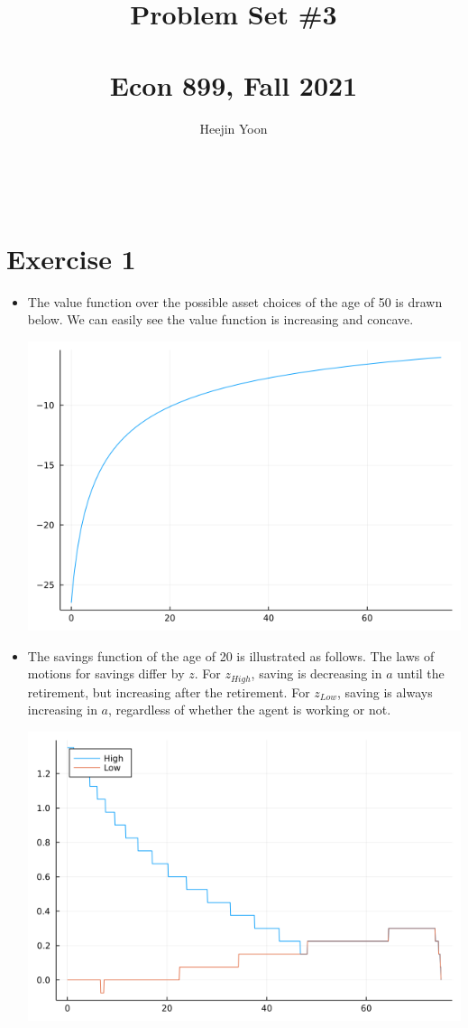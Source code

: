 \documentclass[11pt]{article} %
\title{Problem Set \#3\\ ~\\ \large{Econ 899, Fall 2021} }
\author{Heejin Yoon}
\begin{document}
\maketitle
~\\

\section*{Exercise 1}

\begin{itemize}
	\item The value function over the possible asset choices of the age of 50 is drawn below. We can easily see the value function is increasing and concave. 
	
	\begin{center}
		\includegraphics[width=.8\linewidth]{./julia/val_func_50.png}
	\end{center}
	\pagebreak
	\item The savings function of the age of 20 is illustrated as follows. The laws of motions for savings differ by $z$. For $z_{High}$, saving is decreasing in $a$ until the retirement, but increasing after the retirement. For $z_{Low}$, saving is always increasing in $a$, regardless of whether the agent is working or not.
	
	\begin{center}
		\includegraphics[width=.8\linewidth]{./julia/sav_func_20.png}
	\end{center}
\end{itemize}
~\\
~\\
\end{document}

